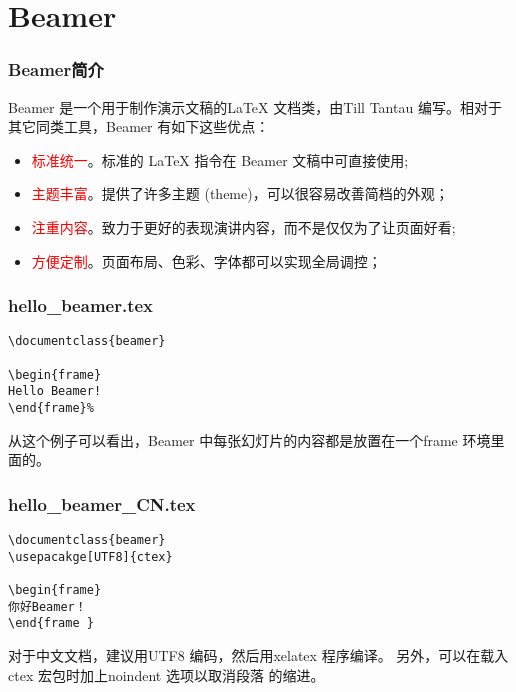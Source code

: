 \section{Beamer}
\begin{frame}\frametitle{Beamer简介}
Beamer 是一个用于制作演示文稿的LaTeX 文档类，由Till
Tantau 编写。相对于其它同类工具，Beamer 有如下这些优点：
\begin{itemize}
    \item<2-> \textcolor{red}{标准统一}。标准的 \LaTeX{} 指令在 Beamer 文稿中可直接使用;
    \item<3-> \textcolor{red}{主题丰富}。提供了许多主题 (theme)，可以很容易改善简档的外观；
    \item<4-> \textcolor{red}{注重内容}。致力于更好的表现演讲内容，而不是仅仅为了让页面好看;
    \item<5-> \textcolor{red}{方便定制}。页面布局、色彩、字体都可以实现全局调控；
\end{itemize}
\end{frame}

\begin{frame}[fragile]\frametitle{hello\_beamer.tex}
\begin{block}{}
    \begin{verbatim}
\documentclass{beamer}

\begin{frame}
Hello Beamer!
\end{frame}%

    \end{verbatim}
\end{block}
从这个例子可以看出，Beamer 中每张幻灯片的内容都是放置在一个frame 环境里面的。
\end{frame}

\begin{frame}[fragile]\frametitle{hello\_beamer\_CN.tex}
\begin{block}{}
    \begin{verbatim}
\documentclass{beamer}
\usepacakge[UTF8]{ctex}

\begin{frame}
你好Beamer！
\end{frame }

    \end{verbatim}
\end{block}
对于中文文档，建议用UTF8 编码，然后用xelatex 程序编译。
另外，可以在载入ctex 宏包时加上noindent 选项以取消段落
的缩进。
\end{frame}

